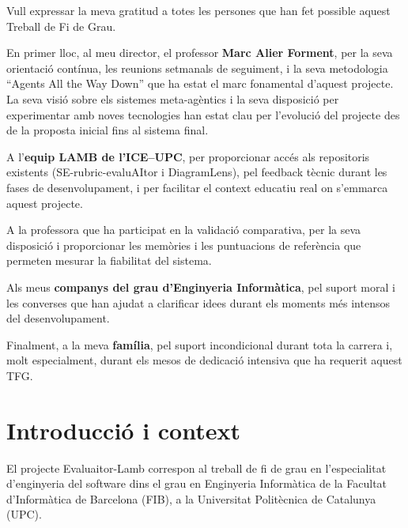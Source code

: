 \documentclass[12pt,a4paper,twoside]{report}
\begin{document}
Vull expressar la meva gratitud a totes les persones que han fet possible aquest Treball de Fi de Grau.

En primer lloc, al meu director, el professor \textbf{Marc Alier Forment}, per la seva orientaci\'o cont\'inua, les reunions setmanals de seguiment, i la seva metodologia ``Agents All the Way Down'' que ha estat el marc fonamental d'aquest projecte. La seva visi\'o sobre els sistemes meta-ag\`entics i la seva disposici\'o per experimentar amb noves tecnologies han estat clau per l'evoluci\'o del projecte des de la proposta inicial fins al sistema final.

A l'\textbf{equip LAMB de l'ICE--UPC}, per proporcionar acc\'es als repositoris existents (SE-rubric-evaluAItor i DiagramLens), pel feedback t\`ecnic durant les fases de desenvolupament, i per facilitar el context educatiu real on s'emmarca aquest projecte.

A la professora que ha participat en la validaci\'o comparativa, per la seva disposici\'o i proporcionar les mem\`ories i les puntuacions de refer\`encia que permeten mesurar la fiabilitat del sistema.

Als meus \textbf{companys del grau d'Enginyeria Inform\`atica}, pel suport moral i les converses que han ajudat a clarificar idees durant els moments m\'es intensos del desenvolupament.

Finalment, a la meva \textbf{fam\'ilia}, pel suport incondicional durant tota la carrera i, molt especialment, durant els mesos de dedicaci\'o intensiva que ha requerit aquest TFG.

\tableofcontents
\newpage

\listoffigures
{}
\newpage

\listoftables
{}
\newpage

\chapter{Introducci\'o i context}
\label{chap:introduccio}

El projecte Evaluaitor-Lamb correspon al treball de fi de grau en l'especialitat d'enginyeria del software dins el grau en Enginyeria Inform\`atica de la Facultat d'Inform\`atica de Barcelona (FIB), a la Universitat Polit\`ecnica de Catalunya (UPC).
\end{document}
